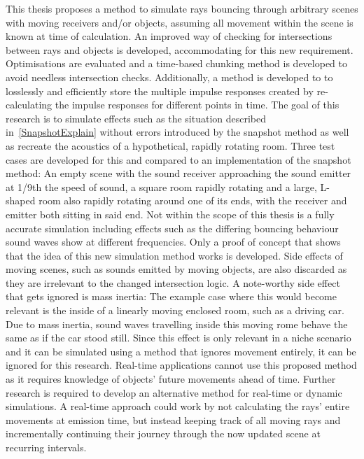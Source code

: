 This thesis proposes a method to simulate rays bouncing through arbitrary scenes with moving receivers and/or objects,
assuming all movement within the scene is known at time of calculation.
An improved way of checking for intersections between rays and objects is developed, accommodating for this new requirement.
Optimisations are evaluated and a time-based chunking method is developed to avoid needless intersection checks.
Additionally, a method is developed to to losslessly and efficiently store the multiple impulse responses created by re-calculating
the impulse responses for different points in time.
The goal of this research is to simulate effects such as the situation described in~\ref{SnapshotExplain} without errors introduced by the snapshot method
as well as recreate the acoustics of a hypothetical, rapidly rotating room.
Three test cases are developed for this and compared to an implementation of the snapshot method:
An empty scene with the sound receiver approaching the sound emitter at 1/9th the speed of sound,
a square room rapidly rotating
and a large, L-shaped room also rapidly rotating around one of its ends, with the receiver and emitter both sitting in said end.
\newline
Not within the scope of this thesis is a fully accurate simulation
including effects such as the differing bouncing behaviour sound waves show at different frequencies.
Only a proof of concept that shows that the idea of this new simulation method works is developed.
\newline
Side effects of moving scenes, such as sounds emitted by moving objects, are also discarded as they are irrelevant to
the changed intersection logic.
A note-worthy side effect that gets ignored is mass inertia:
The example case where this would become relevant is the inside of a linearly moving enclosed room, such as a driving car.
Due to mass inertia, sound waves travelling inside this moving rome behave the same as if the car stood still.
Since this effect is only relevant in a niche scenario and it can be simulated using a method that ignores movement entirely,
it can be ignored for this research.
\newline
Real-time applications cannot use this proposed method as it requires knowledge of objects' future movements ahead of time.
Further research is required to develop an alternative method for real-time or dynamic simulations.
A real-time approach could work by not calculating the rays' entire movements at emission time,
but instead keeping track of all moving rays and incrementally continuing their journey through the now updated scene
at recurring intervals.
